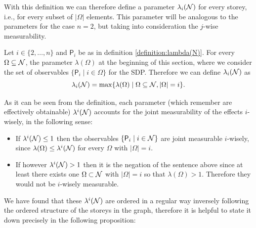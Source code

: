 \documentclass[10pt, a4paper]{amsart}
\begin{document}
With this definition we can therefore define a parameter $\lambda_{i}(\mathcal{N})$ for every storey, i.e., for every subset of $|\Omega | $ elements.
This parameter will be analogous to the parameters for the case $n=2$, but taking into consideration the $j$-wise measurability. \\

\begin{definition}\label{definition:DEFINITION_of_lambdaj}
Let $i\in \{2,\ldots , n\}$ and $\mathsf{P}_{i}$ be as in definition \ref{definition:lambda(N)}. For every $\Omega \subseteq \mathcal{N}$, the parameter $\lambda( \Omega) $ at the beginning of this section, where we consider the set of observables $\{\mathsf{P}_{i}\mid i\in \Omega\}$ for the SDP. Therefore we can define $\lambda_{i}(\mathcal{N})$ as 
\begin{equation*}
\lambda_{i}(\mathcal{N}) = \max\{\lambda(\Omega) \mid \Omega \subseteq \mathcal{N}, |\Omega|  =i \}.
\end{equation*}
\end{definition}

As it can be seen from the definition, each parameter (which remember are effectively obtainable) $\lambda^{i}(\mathcal{N})$ accounts for the joint measurability of the effects $i$-wisely, in the following sense:
\begin{itemize}
\item If $\lambda^{i}(\mathcal{N}) \leq 1$ then the observables $\{\mathsf{P}_{i}\mid i\in \mathcal{N}\}$ are joint measurable $i$-wisely, since $\lambda(\Omega ) \leq \lambda^{i}(\mathcal{N})$ for every $\Omega$ with $|\Omega | = i$.  
\item If however $\lambda^{i}(\mathcal{N}) > 1$ then it is the negation of the sentence above since at least there exists one $\Omega \subset \mathcal{N}$ with $|\Omega| = i$ so that $\lambda(\Omega ) > 1$. Therefore they would not be $i$-wisely measurable. 
\end{itemize}

We have found that these $\lambda^{i}(\mathcal{N})$ are ordered in a regular way inversely following the ordered structure of the storeys in the graph, therefore it is 
helpful to state it down precisely in the following proposition:
\end{document}
